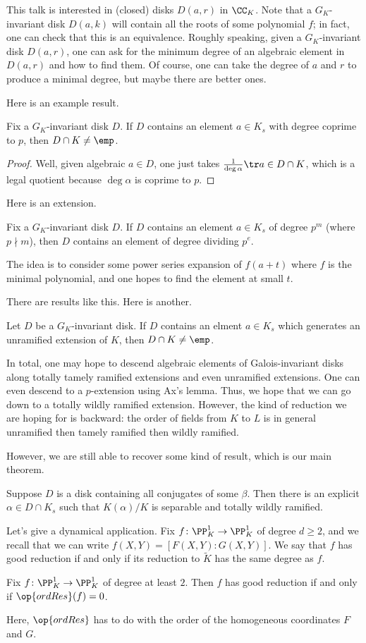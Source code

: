\documentclass{article}
\begin{document}
This talk is interested in (closed) disks $D(a,r)$ in $\CC_K$. Note that a $G_K$-invariant disk $D(a,k)$ will contain all the roots of some polynomial $f$; in fact, one can check that this is an equivalence. Roughly speaking, given a $G_K$-invariant disk $D(a,r)$, one can ask for the minimum degree of an algebraic element in $D(a,r)$ and how to find them. Of course, one can take the degree of $a$ and $r$ to produce a minimal degree, but maybe there are better ones.

Here is an example result.
\begin{proposition}
	Fix a $G_K$-invariant disk $D$. If $D$ contains an element $a\in K_s$ with degree coprime to $p$, then $D\cap K\ne\emp$.
\end{proposition}
\begin{proof}
	Well, given algebraic $a\in D$, one just takes $\frac1{\deg\alpha}\tr a\in D\cap K$, which is a legal quotient because $\deg\alpha$ is coprime to $p$.
\end{proof}
Here is an extension.
\begin{lemma}[Ax]
	Fix a $G_K$-invariant disk $D$. If $D$ contains an element $a\in K_s$ of degree $p^m$ (where $p\nmid m$), then $D$ contains an element of degree dividing $p^e$.
\end{lemma}
The idea is to consider some power series expansion of $f(a+t)$ where $f$ is the minimal polynomial, and one hopes to find the element at small $t$.

There are results like this. Here is another.
\begin{proposition}
	Let $D$ be a $G_K$-invariant disk. If $D$ contains an elment $a\in K_s$ which generates an unramified extension of $K$, then $D\cap K\ne\emp$.
\end{proposition}
In total, one may hope to descend algebraic elements of Galois-invariant disks along totally tamely ramified extensions and even unramified extensions. One can even descend to a $p$-extension using Ax's lemma. Thus, we hope that we can go down to a totally wildly ramified extension. However, the kind of reduction we are hoping for is backward: the order of fields from $K$ to $L$ is in general unramified then tamely ramified then wildly ramified.

However, we are still able to recover some kind of result, which is our main theorem.
\begin{theorem}
	Suppose $D$ is a disk containing all conjugates of some $\beta$. Then there is an explicit $\alpha\in D\cap K_s$ such that $K(\alpha)/K$ is separable and totally wildly ramified.
\end{theorem}
Let's give a dynamical application. Fix $f\colon\PP^1_K\to\PP^1_K$ of degree $d\ge2$, and we recall that we can write $f(X,Y)=[F(X,Y):G(X,Y)]$. We say that $f$ has good reduction if and only if its reduction to $\widetilde K$ has the same degree as $f$.
\begin{theorem}
	Fix $f\colon\PP^1_K\to\PP^1_K$ of degree at least $2$. Then $f$ has good reduction if and only if $\op{ordRes}(f)=0$.
\end{theorem}
Here, $\op{ordRes}$ has to do with the order of the homogeneous coordinates $F$ and $G$.
\end{document}
